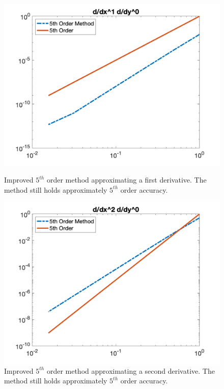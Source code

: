 \begin{figure}[htbp]
	\centering
	\begin{minipage}{.45\textwidth}
		\centering
		\includegraphics[width=1.0\linewidth]{figs/WeightsDer2.png}
		\caption{Improved $5^{th}$ order method approximating a first derivative. The method still holds approximately $5^{th}$ order accuracy.}
		\label{fig:wts1}
	\end{minipage}%
\hfill
	\begin{minipage}{0.45\textwidth}
		\centering
		\includegraphics[width=1.0\linewidth]{figs/WeightsDer3.png}
		\caption{Improved $5^{th}$ order method approximating a second derivative. The method still holds approximately $5^{th}$ order accuracy.}
		\label{fig:wts2}
	\end{minipage}
\end{figure}
